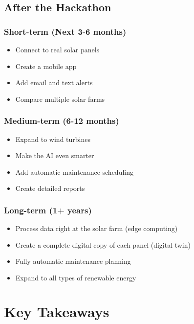 \documentclass[12pt,a4paper]{article}
\begin{document}
\subsection{After the Hackathon}

\subsubsection{Short-term (Next 3-6 months)}
\begin{itemize}[leftmargin=*]
    \item Connect to real solar panels
    \item Create a mobile app
    \item Add email and text alerts
    \item Compare multiple solar farms
\end{itemize}

\subsubsection{Medium-term (6-12 months)}
\begin{itemize}[leftmargin=*]
    \item Expand to wind turbines
    \item Make the AI even smarter
    \item Add automatic maintenance scheduling
    \item Create detailed reports
\end{itemize}

\subsubsection{Long-term (1+ years)}
\begin{itemize}[leftmargin=*]
    \item Process data right at the solar farm (edge computing)
    \item Create a complete digital copy of each panel (digital twin)
    \item Fully automatic maintenance planning
    \item Expand to all types of renewable energy
\end{itemize}

\newpage

\section{Key Takeaways}
\end{document}
